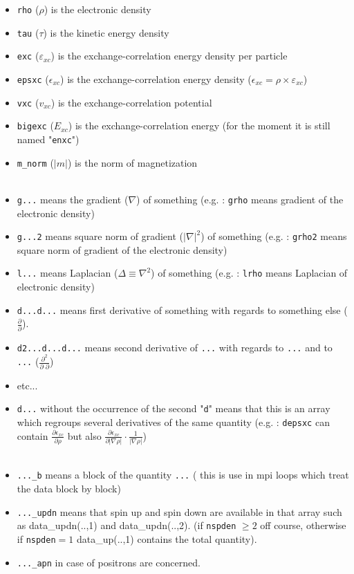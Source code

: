 \documentclass[a4paper,12pt]{report}
\begin{document}
\begin{itemize}
 \item \texttt{rho} ($\rho$) is the electronic density
 \item \texttt{tau} ($\tau$) is the kinetic energy density
 \item \texttt{exc} ($\varepsilon_{xc}$) is the exchange-correlation energy density per particle
 \item \texttt{epsxc} ($\epsilon_{xc}$) is the exchange-correlation energy density ($\epsilon_{xc}=\rho\times\varepsilon_{xc}$)
 \item \texttt{vxc} ($v_{xc}$) is the exchange-correlation potential
 \item \texttt{bigexc} ($E_{xc}$) is the exchange-correlation energy (for the moment it is still named "\texttt{enxc}")
 \item \texttt{m\_norm} ($\vert m \vert$) is the norm of magnetization\\\\

 \item \texttt{g...} means the gradient ($\nabla$) of something (e.g. : \texttt{grho} means gradient of the electronic density)
 \item \texttt{g...2} means square norm of gradient ($\vert \nabla \vert^2$) of something (e.g. : \texttt{grho2}  means square norm of gradient of the electronic density)
 \item \texttt{l...} means Laplacian ($\Delta \equiv \nabla^2$) of something (e.g. : \texttt{lrho} means Laplacian of electronic density)
 \item \texttt{d...d...} means first derivative of something with regards to something else ($\frac{\partial}{\partial}$).
 \item \texttt{d2...d...d...} means second derivative of \texttt{...} with regards to \texttt{...} and to \texttt{...} ($\frac{\partial^2}{\partial\,\,\partial}$)
 \item etc...
 \item \texttt{d...} without the occurrence of the second "\texttt{d}" means that this is an array which regroups several derivatives of the same quantity (e.g. : \texttt{depsxc} can contain $\frac{\partial \epsilon_{xc}}{\partial \rho}$ but also $\frac{\partial \epsilon_{xc}}{\partial \vert \nabla \rho\vert}\cdotp \frac{1}{\vert \nabla \rho\vert}$)\\\\

 \item \texttt{...\_b} means a block of the quantity \texttt{...} ( this is use in mpi loops which treat the data block by block)
 \item \texttt{...\_updn} means that spin up and spin down are available in that array such as data\_updn(..,1) and data\_updn(..,2). (if \texttt{nspden} $\geq2$ off course, otherwise if \texttt{nspden}$=1$ data\_up(..,1) contains the total quantity).
 \item \texttt{...\_apn} in case of positrons are concerned.\\


\end{itemize}
\end{document}
